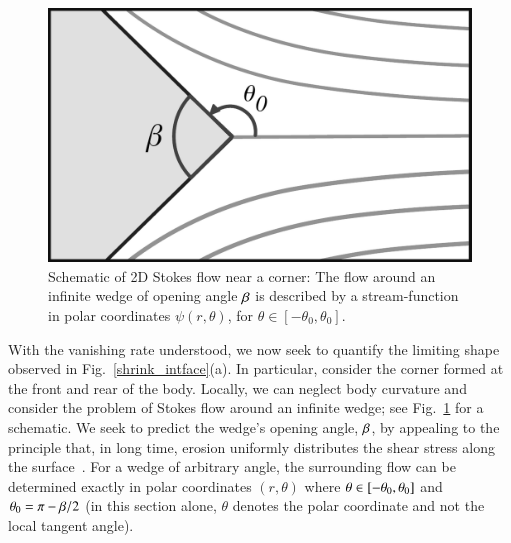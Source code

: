 \documentclass[preprint, 10pt]{elsarticle}
\begin{document}
\begin{figure}%
\begin{center}
\includegraphics[width = 0.4 \textwidth]{./figs/corner.pdf}
\caption{Schematic of 2D Stokes flow near a corner: The flow around an infinite wedge of opening angle $\beta$ is described by a stream-function in polar coordinates $\psi(r,\theta)$, for $\theta \in [-\theta_0, \theta_0]$.}
\label{corner}
\end{center}
\end{figure}
 
With the vanishing rate understood, we now seek to quantify the limiting shape observed in Fig.~\ref{shrink_intface}(a). In particular, consider the corner formed at the front and rear of the body. Locally, we can neglect body curvature and consider the problem of Stokes flow around an infinite wedge; see Fig.~\ref{corner} for a schematic. We seek to predict the wedge's opening angle, $\beta$, by appealing to the principle that, in long time, erosion uniformly distributes the shear stress along the surface~\cite{moo-ris-chi-zha-she2013, moore2017riemann}. For a wedge of arbitrary angle, the surrounding flow can be determined exactly in polar coordinates $(r, \theta)$ where $\theta \in [-\theta_0,\theta_0]$ and $\theta_0 = \pi - \beta/2$ (in this section alone, $\theta$ denotes the polar coordinate and not the local tangent angle). 
\end{document}
